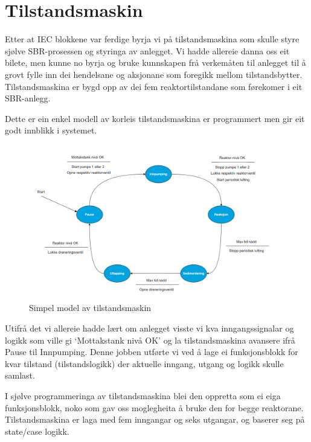 \section{Tilstandsmaskin}
\thispagestyle{fancy}

Etter at IEC blokkene var ferdige byrja vi på tilstandsmaskina som skulle styre sjølve SBR-prosessen
og styringa av anlegget. Vi hadde allereie danna oss eit bilete, men kunne no byrja og bruke kunnskapen frå verkemåten til anlegget
til å grovt fylle inn dei hendelsane og aksjonane som foregikk mellom tilstandsbytter. 
Tilstandsmaskina er bygd opp av dei fem reaktortilstandane som førekomer i eit SBR-anlegg.

Dette er ein enkel modell av korleis tilstandsmaskina er programmert men gir eit godt innblikk i systemet.

\begin{figure}[htbp]
    \centering
    \includegraphics[width=1\textwidth]{Figurar/Simpel tilstandsmaskin.png}
    \caption{Simpel model av tilstandsmaskin}\label{fig:SimpelTilstandsmaskin}
\end{figure}

Utifrå det vi allereie hadde lært om anlegget visste vi kva inngangssignalar og logikk som ville gi
`Mottakstank nivå OK' og la tilstandsmaskina avansere ifrå Pause til Innpumping. Denne jobben utførte vi ved å lage ei
funksjonsblokk for kvar tilstand (tilstandslogikk) der aktuelle inngang, utgang og logikk skulle samlast.

\newpage

I sjølve programmeringa av tilstandsmaskina blei den oppretta som ei eiga funksjonsblokk, noko som gav oss moglegheita å bruke den for begge reaktorane.
Tilstandsmaskina er laga med fem inngangar og seks utgangar, og baserer seg på state/case logikk.

